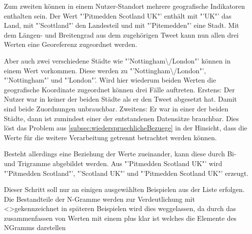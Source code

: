 				Zum zweiten können in einem Nutzer-Standort mehrere geografische Indikatoren enthalten sein.  
				Der Wert "'Pitmedden Scotland UK"' enthält mit "'UK"' das Land, mit "'Scottland"' den Landesteil und mit "'Pitemedden"' eine Stadt. 
				Mit dem Längen- und Breitengrad aus dem zugehörigen Tweet kann nun allen drei Werten eine Georeferenz zugeordnet werden.

				Aber auch zwei verschiedene Städte wie "'Nottingham\textbackslash/London"' können in einem Wert vorkommen.
				Diese werden zu "'Nottingham\textbackslash/London"', "'Nottingham"' und "'London"'.
				Wird hier wiederum beiden Werten die geografische Koordinate zugeordnet können drei Fälle auftreten.
				Erstens: Der Nutzer war in keiner der beiden Städte als er den Tweet abgesetzt hat. 
				Damit sind beide Zuordnungen unbrauchbar.
				Zweitens: Er war in einer der beiden Städte, dann ist zumindest einer der entstandenen Datensätze brauchbar.
				Dies löst das Problem aus \ref{subsec:wiederspruechlicheBezuege} in der Hinsicht, dass die Werte für die weitere Verarbeitung getrennt betrachtet werden können.

				Besteht allerdings eine Beziehung der Werte zueinander, kann diese durch Bi- und Trigramme abgebildet werden.
				Aus "'Pitmedden Scotland UK"' wird "'Pitmedden Scotland"', "'Scotland UK"' und "'Pitmedden Scotland UK"' erzeugt.

				Dieser Schritt soll nur an einigen ausgewählten Beispielen aus der Liste erfolgen.
				Die Bestandteile der N-Gramme werden zur Verdeutlichung mit \textless \textgreater gekennzeichnet in späteren Beispielen wird dies weggelassen, da durch das zusammenfassen von Werten mit einem plus klar ist welches die Elemente des NGramms darstellen

